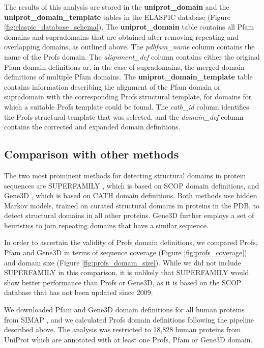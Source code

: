 The results of this analysis are stored in the \textbf{uniprot\_domain} and the \textbf{uniprot\_domain\_template} tables in the ELASPIC database (Figure \ref{fig:elaspic_database_schema}). The \textbf{uniprot\_domain} table contains all Pfam domains and supradomains that are obtained after removing repeating and overlapping domains, as outlined above. The \textit{pdbfam\_name} column contains the name of the Profs domain. The \textit{alignment\_def} column contains either the original Pfam domain definitions or, in the case of supradomains, the merged domain definitions of multiple Pfam domains. The \textbf{uniprot\_domain\_template} table contains information describing the alignment of the Pfam domain or supradomain with the corresponding Profs structural template, for domains for which a suitable Profs template could be found. The \textit{cath\_id} column identifies the Profs structural template that was selected, and the \textit{domain\_def} column contains the corrected and expanded domain definitions.


\subsection{Comparison with other methods}

The two most prominent methods for detecting structural domains in protein sequences are SUPERFAMILY \cite{wilson_superfamilysophisticated_2009}, which is based on SCOP \cite{hubbard_scop:_1999} domain definitions, and Gene3D \cite{lam_gene3d:_2016}, which is based on CATH \cite{cuff_extending_2011} domain definitions. Both methods use hidden Markov models, trained on curated structural domains in proteins in the PDB, to detect structural domains in all other proteins. Gene3D further employs a set of heuristics to join repeating domains that have a similar sequence.

In order to ascertain the validity of Profs domain definitions, we compared Profs, Pfam and Gene3D in terms of sequence coverage (Figure \ref{fig:profs_coverage}) and domain size (Figure \ref{fig:profs_domain_size}). While we did not include SUPERFAMILY in this comparison, it is unlikely that SUPERFAMILY would show better performance than Profs or Gene3D, as it is based on the SCOP database that has not been updated since 2009.

We downloaded Pfam and Gene3D domain definitions for all human proteins from SIMAP \cite{rattei_simapcomprehensive_2010}, and we calculated Profs domain definitions following the pipeline described above. The analysis was restricted to 18,828 human proteins from UniProt which are annotated with at least one Profs, Pfam or Gene3D domain.

